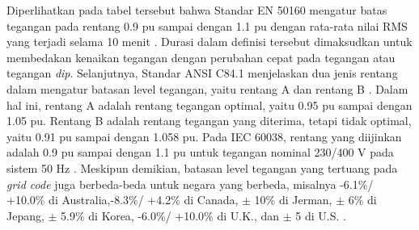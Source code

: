 {{Diperlihatkan pada tabel tersebut bahwa Standar EN 50160 mengatur batas tegangan pada rentang 0.9 pu sampai dengan 1.1 pu dengan rata-rata nilai RMS yang terjadi selama 10 menit \cite{ENStd.501602000}. Durasi dalam definisi tersebut dimaksudkan untuk membedakan kenaikan tegangan dengan perubahan cepat pada tegangan atau tegangan \textit{dip}. Selanjutnya, Standar ANSI C84.1 menjelaskan dua jenis rentang dalam mengatur batasan level tegangan, yaitu rentang A dan rentang B \cite{ANSI2011}. Dalam hal ini, rentang A adalah rentang tegangan optimal, yaitu 0.95 pu sampai dengan 1.05 pu. Rentang B adalah rentang tegangan yang diterima, tetapi tidak optimal, yaitu 0.91 pu sampai dengan 1.058 pu. Pada IEC 60038, rentang yang diijinkan adalah 0.9 pu sampai dengan 1.1 pu untuk tegangan nominal 230/400 V pada sistem 50 Hz \cite{IEC60038:2002}. Meskipun demikian, batasan level tegangan yang tertuang pada \textit{grid code} juga berbeda-beda untuk negara yang berbeda, misalnya -6.1\%/ +10.0\% di Australia,-8.3\%/ +4.2\% di Canada, $\pm$ 10\% di Jerman, $\pm$ 6\% di Jepang, $\pm$ 5.9\% di Korea, -6.0\%/ +10.0\% di U.K., dan $\pm$ 5 di U.S. \cite{Lee2017}. 


}}
